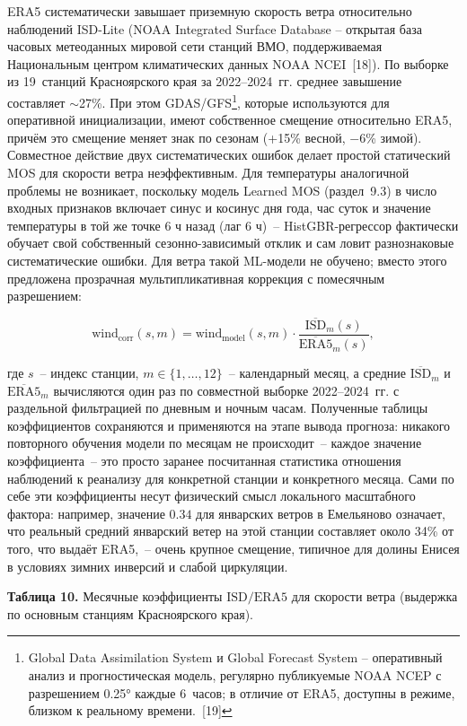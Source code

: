 \documentclass[14pt,a4paper]{extarticle}
\numberwithin{table}{section}
\numberwithin{figure}{section}
\numberwithin{equation}{section}
\begin{document}
ERA5 систематически завышает приземную скорость ветра относительно
наблюдений ISD-Lite (NOAA Integrated Surface Database -- открытая база
часовых метеоданных мировой сети станций ВМО, поддерживаемая Национальным
центром климатических данных NOAA NCEI~[18]). По выборке из 19~станций
Красноярского края за 2022--2024~гг. среднее завышение составляет
$\sim$27\%. При этом GDAS/GFS\footnote{Global Data Assimilation System и
Global Forecast System -- оперативный анализ и прогностическая модель,
регулярно публикуемые NOAA NCEP с разрешением 0.25° каждые 6~часов; в
отличие от ERA5, доступны в режиме, близком к реальному времени.~[19]},
которые используются для оперативной инициализации, имеют собственное
смещение относительно ERA5, причём это смещение меняет знак по сезонам
(+15\% весной, $-6$\% зимой). Совместное действие двух систематических
ошибок делает простой статический MOS для скорости ветра неэффективным.
Для температуры аналогичной проблемы не возникает, поскольку модель
Learned MOS (раздел~9.3) в число входных признаков включает синус и
косинус дня года, час суток и значение температуры в той же точке
6 ч назад (лаг 6 ч)~-- HistGBR-регрессор фактически
обучает свой собственный сезонно-зависимый отклик и сам ловит
разнознаковые систематические ошибки. Для ветра такой ML-модели
не обучено; вместо этого предложена прозрачная мультипликативная
коррекция с помесячным разрешением:

\[
\text{wind}_{\text{corr}}(s, m) = \text{wind}_{\text{model}}(s, m) \cdot
\frac{\overline{\text{ISD}}_m(s)}{\overline{\text{ERA5}}_m(s)},
\]

где $s$~-- индекс станции, $m \in \{1, \dots, 12\}$~-- календарный
месяц, а средние $\overline{\text{ISD}}_m$ и $\overline{\text{ERA5}}_m$
вычисляются один раз по совместной выборке 2022--2024~гг. с раздельной
фильтрацией по дневным и ночным часам. Полученные таблицы коэффициентов
сохраняются и применяются на этапе вывода прогноза: никакого повторного
обучения модели по месяцам не происходит~-- каждое значение коэффициента~--
это просто заранее посчитанная статистика отношения наблюдений к
реанализу для конкретной станции и конкретного месяца. Сами по себе
эти коэффициенты несут физический смысл локального масштабного фактора:
например, значение $0.34$ для январских ветров в Емельяново означает,
что реальный средний январский ветер на этой станции составляет около
34\% от того, что выдаёт ERA5,~-- очень крупное смещение, типичное для
долины Енисея в условиях зимних инверсий и слабой циркуляции.

\textbf{Таблица 10.} Месячные коэффициенты $\text{ISD}/\text{ERA5}$
для скорости ветра (выдержка по основным станциям Красноярского края).
\end{document}
